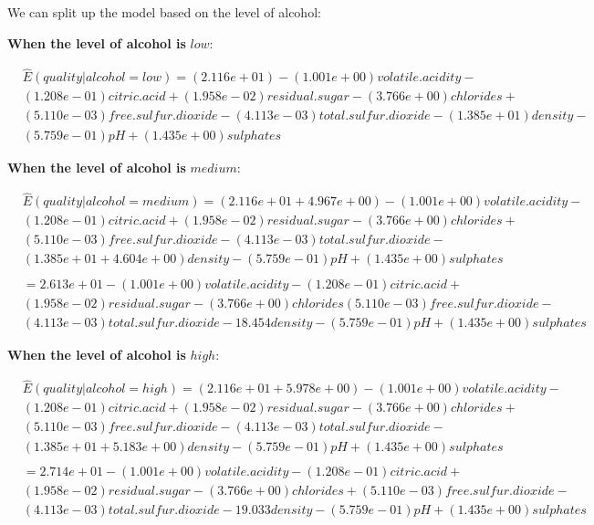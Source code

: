 \documentclass[
]{article}
\begin{document}
We can split up the model based on the level of alcohol:

\textbf{When the level of alcohol is} \(low\):

\[
\begin{align}
&\hat{E}(quality|alcohol=low) = (2.116e+01) - (1.001e+00)volatile.acidity - \\
&(1.208e-01)citric.acid + (1.958e-02)residual.sugar - (3.766e+00)chlorides + \\ 
& (5.110e-03)free.sulfur.dioxide -(4.113e-03)total.sulfur.dioxide -(1.385e+01)density - \\
& (5.759e-01)pH + (1.435e+00)sulphates
\end{align}
\]

\textbf{When the level of alcohol is} \(medium\):

\[
\begin{align}
&\hat{E}(quality|alcohol=medium) =  (2.116e+01 + 4.967e+00) - (1.001e+00)volatile.acidity - \\
&(1.208e-01)citric.acid + (1.958e-02)residual.sugar - (3.766e+00)chlorides + \\ 
& (5.110e-03)free.sulfur.dioxide -(4.113e-03)total.sulfur.dioxide - \\ 
& (1.385e+01+4.604e+00) density  -(5.759e-01)pH + (1.435e+00)sulphates \\ \\
& = 2.613e+01 - (1.001e+00)volatile.acidity -(1.208e-01)citric.acid + \\ 
& (1.958e-02)residual.sugar - (3.766e+00)chlorides (5.110e-03)free.sulfur.dioxide - \\ 
&(4.113e-03)total.sulfur.dioxide - 18.454 density  -(5.759e-01)pH + (1.435e+00)sulphates
\end{align}
\]

\textbf{When the level of alcohol is} \(high\):

\[
\begin{align}
&\hat{E}(quality|alcohol=high) = (2.116e+01 + 5.978e+00) - (1.001e+00)volatile.acidity - \\
&(1.208e-01)citric.acid + (1.958e-02)residual.sugar - (3.766e+00)chlorides + \\ 
& (5.110e-03)free.sulfur.dioxide -(4.113e-03)total.sulfur.dioxide - \\ 
& (1.385e+01+ 5.183e+00)density -(5.759e-01)pH + (1.435e+00)sulphates \\ \\
& = 2.714e+01 - (1.001e+00)volatile.acidity -(1.208e-01)citric.acid + \\
& (1.958e-02)residual.sugar - (3.766e+00)chlorides + (5.110e-03)free.sulfur.dioxide - \\ 
& (4.113e-03)total.sulfur.dioxide - 19.033density -(5.759e-01)pH + (1.435e+00)sulphates 
\end{align}
\]
\end{document}
